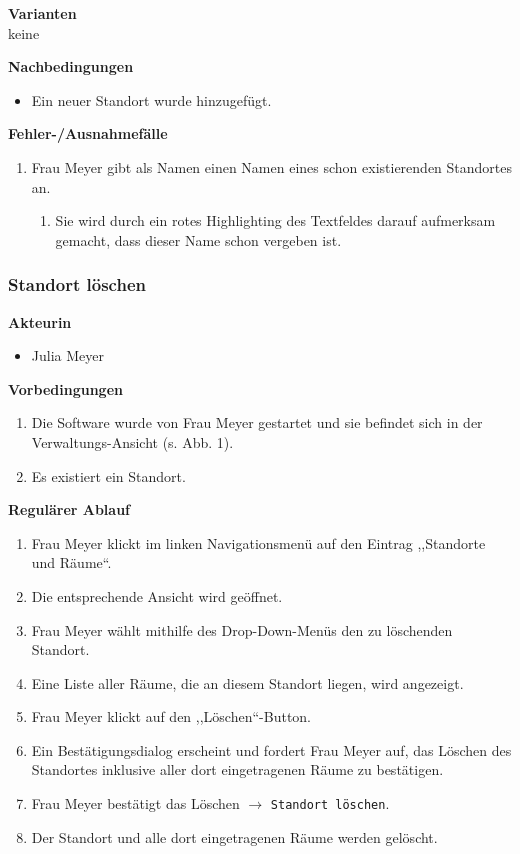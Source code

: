 \documentclass[fontsize=12pt,paper=a4,twoside]{scrartcl}
\begin{document}
\textbf{Varianten}\\
keine
\vspace{5pt}

\textbf{Nachbedingungen}
\begin{itemize}
\item Ein neuer Standort wurde hinzugefügt.
\end{itemize}
\vspace{5pt}

\textbf{Fehler-/Ausnahmefälle}\\
\begin{enumerate}
\item Frau Meyer gibt als Namen einen Namen eines schon existierenden Standortes an.
	\begin{enumerate}[label=\arabic*.]
	\item Sie wird durch ein rotes Highlighting des Textfeldes darauf aufmerksam gemacht, dass dieser Name schon vergeben ist.
	\end{enumerate}
\end{enumerate}

\subsubsection{Standort löschen}
\textbf{Akteurin}
\begin{itemize}
\item Julia Meyer
\end{itemize}
\vspace{5pt}

\textbf{Vorbedingungen}
\begin{enumerate}
\item Die Software wurde von Frau Meyer gestartet und sie befindet sich in der Verwaltungs-Ansicht (s. Abb. 1).
\item Es existiert ein Standort.
\end{enumerate}
\vspace{5pt}

\textbf{Regulärer Ablauf}
\begin{enumerate}
\item Frau Meyer klickt im linken Navigationsmenü auf den Eintrag ,,Standorte und Räume``.
\item Die entsprechende Ansicht wird geöffnet.
\item Frau Meyer wählt mithilfe des Drop-Down-Menüs den zu löschenden Standort.
\item Eine Liste aller Räume, die an diesem Standort liegen, wird angezeigt.
\item Frau Meyer klickt auf den ,,Löschen``-Button.
\item Ein Bestätigungsdialog erscheint und fordert Frau Meyer auf, das Löschen des Standortes inklusive aller dort eingetragenen Räume zu bestätigen.
\item Frau Meyer bestätigt das Löschen $\rightarrow$ \texttt{Standort löschen}.
\item Der Standort und alle dort eingetragenen Räume werden gelöscht.
\end{enumerate}
\vspace{5pt}
\end{document}
